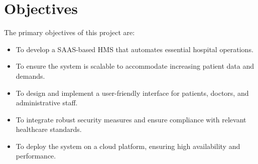 \newpage
\section{Objectives}
The primary objectives of this project are:
\begin{itemize}
    \item To develop a SAAS-based HMS that automates essential hospital operations.
    \item To ensure the system is scalable to accommodate increasing patient data and demands.
    \item To design and implement a user-friendly interface for patients, doctors, and administrative staff.
    \item To integrate robust security measures and ensure compliance with relevant healthcare standards.
    \item To deploy the system on a cloud platform, ensuring high availability and performance.
\end{itemize}
